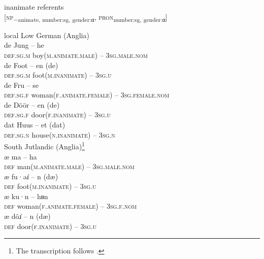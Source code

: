 \documentclass[output=paper]{langsci/langscibook}
\begin{document}
	\ex\label{ex:hoeder:12b}
	inanimate referents\\
       {[}\textsc{np}\textsc{\textsubscript{$-$}}\textsubscript{animate}\textsubscript{, number:sg, gender:}\textsubscript{α}, \textsc{pron}\textsubscript{number:sg, gender:}\textsubscript{α}{]}
       
    \z
\ex \label{ex:hoeder:13}
	local Low German (Anglia)\\
	\ea\label{ex:hoeder:13a}
	\gll de Jung – he\\
     \textsc{def.sg.m} boy(\textsc{m.animate.male}) – 3\textsc{sg.male.nom}\\

	\ex\label{ex:hoeder:13b}
	\gll de Foot – en (de)\\
     \textsc{def.sg.m}{} foot(\textsc{m.inanimate}) – 3\textsc{sg.u}\\

	\ex\label{ex:hoeder:13c}
	\gll de Fru – se\\
     \textsc{def.sg.f} woman(\textsc{f.animate.female}){} – 3\textsc{sg.female.nom}\\

	\ex\label{ex:hoeder:13d}
	\gll de Döör –{} en (de)\\
     \textsc{def.sg.f}{} door(\textsc{f.inanimate}) – 3\textsc{sg.u}\\

	\ex\label{ex:hoeder:13e}
	\gll dat Huus – et (dat)\\
     \textsc{def.sg.n} house(\textsc{n.inanimate}){} – 3\textsc{sg.n}\\
\z
\ex\label{ex:hoeder:14}
South Jutlandic (Anglia)\footnote{The transcription follows \citet{JulNielsen.1995}.}\\
	\ea\label{ex:hoeder:14a}	
	\gll æ ma\hoederN{} – ha\hoederN{}\\
     \textsc{def} man(\textsc{m.animate.male}){} – 3\textsc{sg.male.nom}\\

	\ex\label{ex:hoeder:14b}	
	\gll æ fu·əɹ̇ – n (dæ\hoederN{})\\
     \textsc{def}{} foot(\textsc{m.inanimate}) – 3\textsc{sg.u}\\

	\ex\label{ex:hoeder:14c}	
	\gll æ ku·n – hᴕn\\
     \textsc{def} woman(\textsc{f.animate.female}) – 3\textsc{sg.f.nom}\\

	\ex\label{ex:hoeder:14d}	
	\gll æ döɹ̇ – n (dæ\hoederN{})\\
     \textsc{def}{} door(\textsc{f.inanimate}) – 3\textsc{sg.u}\\
\end{document}
